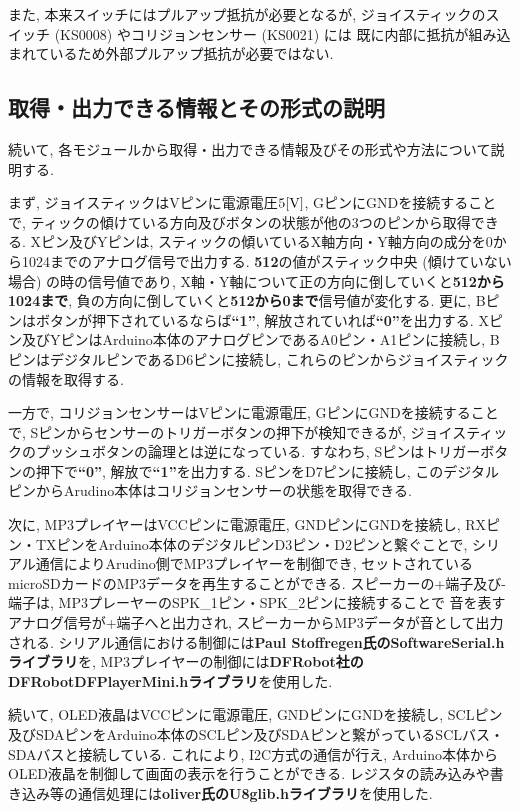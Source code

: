 \documentclass[10pt]{jsarticle}
\begin{document}
また, 本来スイッチにはプルアップ抵抗が必要となるが, ジョイスティックのスイッチ (KS0008) やコリジョンセンサー (KS0021) には
既に内部に抵抗が組み込まれているため外部プルアップ抵抗が必要ではない.

\subsection{取得・出力できる情報とその形式の説明}

続いて, 各モジュールから取得・出力できる情報及びその形式や方法について説明する.

まず, ジョイスティックはVピンに電源電圧$5\rm{[V]}$, GピンにGNDを接続することで, 
ティックの傾けている方向及びボタンの状態が他の3つのピンから取得できる.
Xピン及びYピンは, スティックの傾いているX軸方向・Y軸方向の成分を0から1024までのアナログ信号で出力する.
\textbf{512}の値がスティック中央 (傾けていない場合) の時の信号値であり, 
X軸・Y軸について正の方向に倒していくと\textbf{512から1024まで}, 負の方向に倒していくと\textbf{512から0まで}信号値が変化する. 
更に, Bピンはボタンが押下されているならば\textbf{``1''}, 解放されていれば\textbf{``0''}を出力する.
Xピン及びYピンはArduino本体のアナログピンであるA0ピン・A1ピンに接続し, BピンはデジタルピンであるD6ピンに接続し, 
これらのピンからジョイスティックの情報を取得する.

一方で, コリジョンセンサーはVピンに電源電圧, GピンにGNDを接続することで, Sピンからセンサーのトリガーボタンの押下が検知できるが, 
ジョイスティックのプッシュボタンの論理とは逆になっている.
すなわち, Sピンはトリガーボタンの押下で\textbf{``0''}, 解放で\textbf{``1''}を出力する.
SピンをD7ピンに接続し, このデジタルピンからArudino本体はコリジョンセンサーの状態を取得できる.

次に, MP3プレイヤーはVCCピンに電源電圧, GNDピンにGNDを接続し, 
RXピン・TXピンをArduino本体のデジタルピンD3ピン・D2ピンと繋ぐことで, 
シリアル通信によりArudino側でMP3プレイヤーを制御でき, セットされているmicroSDカードのMP3データを再生することができる.
スピーカーの+端子及び-端子は, MP3プレーヤーのSPK\_1ピン・SPK\_2ピンに接続することで
音を表すアナログ信号が+端子へと出力され, スピーカーからMP3データが音として出力される.
シリアル通信における制御には\textbf{Paul Stoffregen氏のSoftwareSerial.hライブラリ}を, 
MP3プレイヤーの制御には\textbf{DFRobot社のDFRobotDFPlayerMini.hライブラリ}を使用した.

続いて, OLED液晶はVCCピンに電源電圧, GNDピンにGNDを接続し, 
SCLピン及びSDAピンをArduino本体のSCLピン及びSDAピンと繋がっているSCLバス・SDAバスと接続している. 
これにより, I2C方式の通信が行え, Arduino本体からOLED液晶を制御して画面の表示を行うことができる.
レジスタの読み込みや書き込み等の通信処理には\textbf{oliver氏のU8glib.hライブラリ}を使用した.
\end{document}
